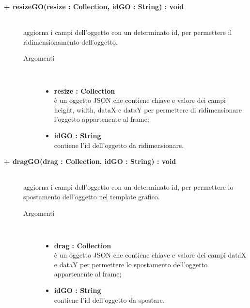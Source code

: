 \begin{description}
\begin{description}
\begin{description}
\begin{description}
\end{description}

\end{description}

\begin{description}
		\item[\textbf{\color{blue}+ resizeGO(resize : Collection, idGO : String) : void			}] \hfill \\
			aggiorna i campi dell'oggetto con un determinato id, per permettere il ridimensionamento dell'oggetto.    

\begin{description}
			\item[Argomenti] \hfill \\
				\begin{itemize}
					\item \textbf{resize : Collection			} \hfill \\
					è un oggetto JSON che contiene chiave e valore dei campi height, width, dataX e dataY per permettere di ridimensionare l'oggetto appartenente al frame;
					\item \textbf{idGO : String			} \hfill \\
					contiene l'id dell'oggetto da ridimensionare.
				\end{itemize}

\end{description}

\end{description}

\begin{description}
		\item[\textbf{\color{blue}+ dragGO(drag : Collection, idGO : String) : void			}] \hfill \\
			aggiorna i campi dell'oggetto con un determinato id, per permettere lo spostamento dell'oggetto nel template grafico.    

\begin{description}
			\item[Argomenti] \hfill \\
				\begin{itemize}
					\item \textbf{drag : Collection			} \hfill \\
					è un oggetto JSON che contiene chiave e valore dei campi dataX e dataY per permettere lo spostamento dell'oggetto appartenente al frame;
					\item \textbf{idGO : String			} \hfill \\
					contiene l'id dell'oggetto da spostare.
				\end{itemize}


\end{description}
\end{description}
\end{description}
\end{description}

